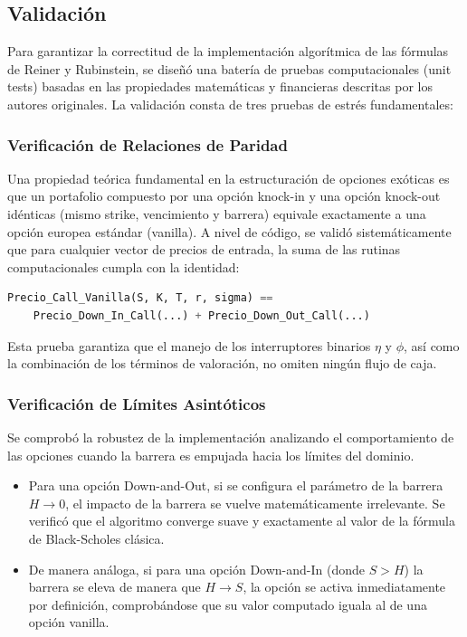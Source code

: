 \subsection{Validación}
\label{subsec:validacion_rr}

Para garantizar la correctitud de la implementación algorítmica de las fórmulas de Reiner y Rubinstein, se diseñó una batería de pruebas computacionales (unit tests) basadas en las propiedades matemáticas y financieras descritas por los autores originales. La validación consta de tres pruebas de estrés fundamentales:

\subsubsection{Verificación de Relaciones de Paridad}

Una propiedad teórica fundamental en la estructuración de opciones exóticas es que un portafolio compuesto por una opción knock-in y una opción knock-out idénticas (mismo strike, vencimiento y barrera) equivale exactamente a una opción europea estándar (vanilla). A nivel de código, se validó sistemáticamente que para cualquier vector de precios de entrada, la suma de las rutinas computacionales cumpla con la identidad:
\begin{lstlisting}[language=Python]
Precio_Call_Vanilla(S, K, T, r, sigma) == 
    Precio_Down_In_Call(...) + Precio_Down_Out_Call(...)
\end{lstlisting}
Esta prueba garantiza que el manejo de los interruptores binarios $\eta$ y $\phi$, así como la combinación de los términos de valoración, no omiten ningún flujo de caja.

\subsubsection{Verificación de Límites Asintóticos}

Se comprobó la robustez de la implementación analizando el comportamiento de las opciones cuando la barrera es empujada hacia los límites del dominio.

\begin{itemize}
  \item Para una opción Down-and-Out, si se configura el parámetro de la barrera $H\to0$, el impacto de la barrera se vuelve matemáticamente irrelevante. Se verificó que el algoritmo converge suave y exactamente al valor de la fórmula de Black-Scholes clásica.
  \item De manera análoga, si para una opción Down-and-In (donde $S>H$) la barrera se eleva de manera que $H\to S$, la opción se activa inmediatamente por definición, comprobándose que su valor computado iguala al de una opción vanilla.
\end{itemize}

